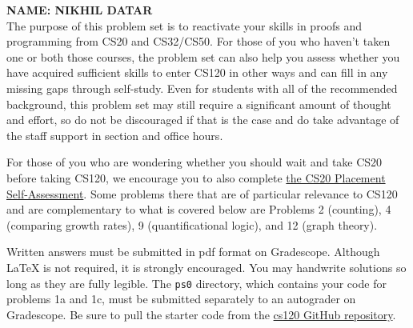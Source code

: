 \documentclass[11pt]{article}
\begin{document}

\textbf{NAME: NIKHIL DATAR} \\

The purpose of this problem set is to reactivate your skills in proofs and programming from CS20 and CS32/CS50. For those of you who haven't taken one or both those courses, the problem set can also help you assess whether you have acquired sufficient skills to enter CS120 in other ways and can fill in any missing gaps through self-study. Even for students with all of the recommended background, this problem set may still require a significant amount of thought and effort, so do not be discouraged if that is the case and do take advantage of the staff support in section and office hours. 

For those of you who are wondering whether you should wait and take CS20 before taking CS120, we encourage you to also complete  \href{https://drive.google.com/file/d/1QIJR6sb9hfkK67PhpQaK9KQBzYwzXvsW/view}{the CS20 Placement Self-Assessment}.  Some problems there that are of particular relevance to CS120 and are complementary to what is covered below are Problems 2 (counting), 4 (comparing growth rates), 9 (quantificational logic), and 12 (graph theory). 

Written answers must be submitted in pdf format on Gradescope. Although \LaTeX{} is not required, it is strongly encouraged. You may handwrite solutions so long as they are fully legible. The \texttt{ps0} directory, which contains your code for problems 1a and 1c, must be submitted separately to an autograder on Gradescope. Be sure to pull the starter code from the \href{https://github.com/Harvard-CS-120/cs120}{cs120 GitHub repository}.

 \newcommand{\children}{\mathit{children}}
 \newcommand{\parent}{\mathit{parent}}
 
\end{document}
